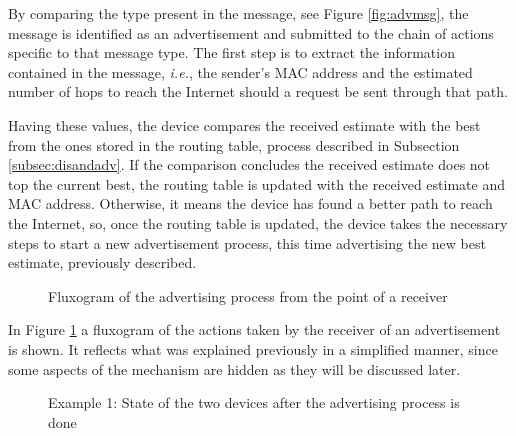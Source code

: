 By comparing the type present in the message, see Figure \ref{fig:advmsg}, the message is identified as an advertisement and submitted to the chain of actions specific to that message type. The first step is to extract the information contained in the message, \textit{i.e.}, the sender's \gls{MAC} address and the estimated number of hops to reach the Internet should a request be sent through that path.

Having these values, the device compares the received estimate with the best from the ones stored in the routing table, process described in Subsection \ref{subsec:disandadv}. If the comparison concludes the received estimate does not top the current best, the routing table is updated with the received estimate and \gls{MAC} address. Otherwise, it means the device has found a better path to reach the Internet, so, once the routing table is updated, the device takes the necessary steps to start a new advertisement process, this time advertising the new best estimate, previously described. 

\begin{figure}[ht]
   \noindent{}
	\caption{\label{fig:recvadvflux} Fluxogram of the advertising process from the point of a receiver}
\end{figure}

In Figure \ref{fig:recvadvflux} a fluxogram of the actions taken by the receiver of an advertisement is shown. It reflects what was explained previously in a simplified manner, since some aspects of the mechanism are hidden as they will be discussed later.

\begin{figure}[ht]
   \noindent{}
	\caption{\label{fig:adveg2} Example 1: State of the two devices after the advertising process is done} 
\end{figure}

